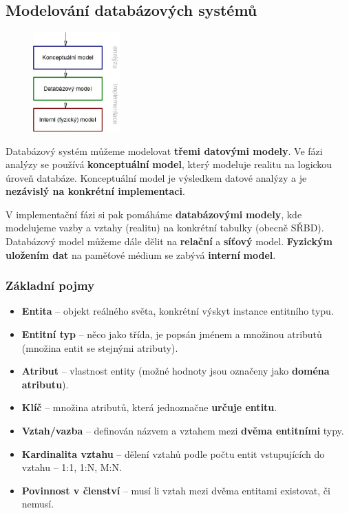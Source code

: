 \subsection{Modelování databázových systémů}
\begin{figure}[H]
	\centering
	\includegraphics[width=0.3\textwidth]{assets/modelovani.png}
\end{figure}

Databázový systém můžeme modelovat \textbf{třemi datovými modely}. Ve fázi analýzy se používá \textbf{konceptuální} \textbf{model}, který modeluje realitu na logickou úroveň databáze. Konceptuální model je výsledkem datové analýzy a je \textbf{nezávislý na konkrétní implementaci}. 

V implementační fázi si pak pomáháme \textbf{databázovými} \textbf{modely}, kde modelujeme vazby a vztahy (realitu) na konkrétní tabulky (obecně SŘBD). Databázový model můžeme dále dělit na \textbf{relační} a \textbf{síťový} model. \textbf{Fyzickým uložením dat} na paměťové médium se zabývá \textbf{interní} \textbf{model}.

\subsubsection{Základní pojmy}
\begin{itemize}
	\item \textbf{Entita} -- objekt reálného světa, konkrétní výskyt instance entitního typu.
	\item \textbf{Entitní typ} -- něco jako třída, je popsán jménem a množinou atributů (množina entit se stejnými atributy).
	\item \textbf{Atribut} -- vlastnost entity (možné hodnoty jsou označeny jako \textbf{doména atributu}).
	\item \textbf{Klíč} -- množina atributů, která jednoznačne \textbf{určuje entitu}.
	\item \textbf{Vztah/vazba} -- definován názvem a vztahem mezi \textbf{dvěma entitními} typy.
	\item \textbf{Kardinalita vztahu} -- dělení vztahů podle počtu entit vstupujících do vztahu -- 1:1, 1:N, M:N.
	\item \textbf{Povinnost v členství} -- musí li vztah mezi dvěma entitami existovat, či nemusí.
\end{itemize}

